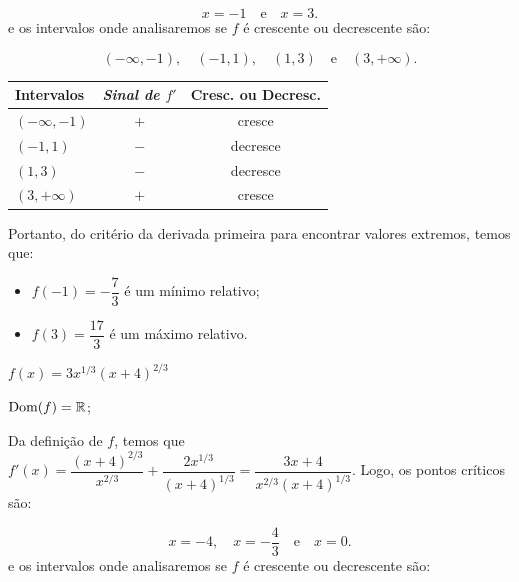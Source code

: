 \cleardoublepage\documentclass[../main.tex]{subfiles}
\begin{document}
\begin{ex}
\begin{compactenum}[a)]
\begin{solution}
\begin{compactenum}[1.]
\[ x=-1\quad\mbox{e}\quad x=3. \]
e os intervalos onde analisaremos se \(f\) é crescente ou decrescente são:

\[ (-\infty,-1),\quad(-1,1),\quad (1,3)\quad \mbox{e}\quad (3,+\infty). \]
\begin{center}
  \begin{tabular}{l|c|c}
  \toprule
    \textbf{Intervalos} &	\emph{Sinal de \(f'\)} &	\textbf{Cresc. ou Decresc.}\\\hline
\((-\infty,-1)\) &\(+\)& cresce\\\hline
\((-1,1)\)&\(-\)&decresce\\\hline
\((1,3)\) & \(-\) & decresce\\\hline
\((3,+\infty)\)&\(+\)& cresce\\
\bottomrule
  \end{tabular}
  \end{center}
   \end{compactenum}
 Portanto, do critério da derivada primeira para encontrar valores extremos, temos que:
\begin{itemize}
    \item \(f(-1)=- \dfrac{7}{3} \) é um mínimo relativo;
\item \(f(3)= \dfrac{17}{3} \) é um máximo relativo.
\end{itemize}
 \end{solution}
 \item \(f(x)=3x^{1/3}(x+4)^{2/3}\)
 
 \begin{solution}
 \begin{compactenum}[1.]
 \item \({\rm Dom}(f)=\mathbb{R}\);
\item Da definição de \(f\), temos que \(f'(x)=\dfrac{(x+4)^{2/3}}{x^{2/3}}+ \dfrac{2x^{1/3}}{(x+4)^{1/3}}=\dfrac{3x+4}{x^{2/3}(x+4)^{1/3}}\).
Logo, os pontos críticos são:

\[ x=-4,\quad x=-\dfrac{4}{3}\quad\mbox{e}\quad x=0. \]
e os intervalos onde analisaremos se \(f\) é crescente ou decrescente são:


\end{compactenum}
\end{solution}
\end{compactenum}
\end{ex}
\end{document}

